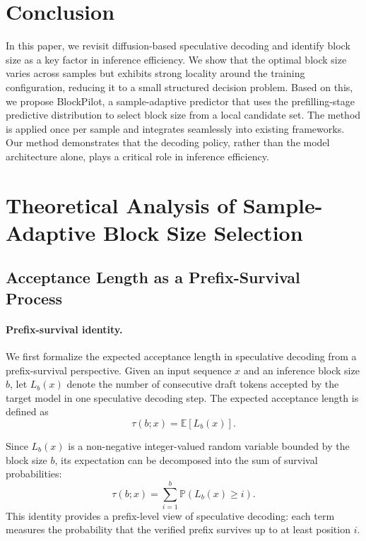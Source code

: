 \documentclass{article}
\begin{document}
\section{Conclusion}
In this paper, we revisit diffusion-based speculative decoding and identify block size as a key factor in inference efficiency. We show that the optimal block size varies across samples but exhibits strong locality around the training configuration, reducing it to a small structured decision problem. Based on this, we propose BlockPilot, a  sample-adaptive predictor that uses the prefilling-stage predictive distribution to select block size from a local candidate set. The method is applied once per sample and integrates seamlessly into existing frameworks. Our method demonstrates that the decoding policy, rather than the model architecture alone, plays a critical role in inference efficiency.


% 




\appendix
\newpage

\section{Theoretical Analysis of Sample-Adaptive Block Size Selection}
\label{Theoretical Analysis}

\subsection{Acceptance Length as a Prefix-Survival Process}

\paragraph{Prefix-survival identity.}
We first formalize the expected acceptance length in speculative decoding from a prefix-survival perspective. Given an input sequence $x$ and an inference block size $b$, let $L_b(x)$ denote the number of consecutive draft tokens accepted by the target model in one speculative decoding step. The expected acceptance length is defined as
\begin{equation}
\tau(b;x)
=
\mathbb{E}[L_b(x)].
\end{equation}

Since $L_b(x)$ is a non-negative integer-valued random variable bounded by the block size $b$, its expectation can be decomposed into the sum of survival probabilities:
\begin{equation}
\tau(b;x)
=
\sum_{i=1}^{b}
\mathbb{P}(L_b(x)\ge i).
\end{equation}
This identity provides a prefix-level view of speculative decoding: each term measures the probability that the verified prefix survives up to at least position $i$.
\end{document}
